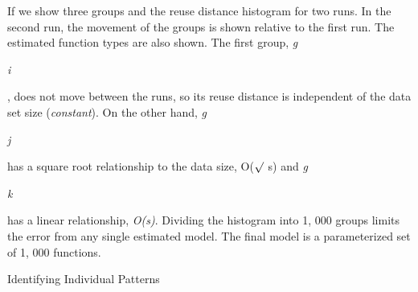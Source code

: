 \documentclass[12pt]{article}
\begin{document}
\vspace{\baselineskip}
\begin{adjustwidth}{0.0in}{0.01in}
{\fontsize{10pt}{12.0pt}\selectfont \textcolor[HTML]{333333}{If we show three groups and the reuse distance histogram for two runs. In the second run, the movement of the groups is shown relative to the first run. The estimated function types are also shown. The first group, \textit{g}}{\fontsize{7pt}{8.4pt}\selectfont \textit{\textcolor[HTML]{333333}{i}}{\fontsize{10pt}{12.0pt}\selectfont \textcolor[HTML]{333333}{, does not move between the runs, so its reuse distance is independent of the data set size (\textit{constant}). On the other hand, \textit{g}}{\fontsize{7pt}{8.4pt}\selectfont \textit{\textcolor[HTML]{333333}{j}}{\fontsize{10pt}{12.0pt}\selectfont \textcolor[HTML]{333333}{ has a square root relationship to the data size, O($ \surd$ s) and \textit{g}}{\fontsize{7pt}{8.4pt}\selectfont \textit{\textcolor[HTML]{333333}{k}}{\fontsize{10pt}{12.0pt}\selectfont \textcolor[HTML]{333333}{ has a linear relationship, \textit{O(s)}. Dividing the histogram into 1, 000 groups limits the error from any single estimated model. The final model is a parameterized set of 1, 000 functions.}\par}\par}\par}\par}\par}\par}\par}\par

\end{adjustwidth}


\vspace{\baselineskip}
\begin{adjustwidth}{0.07in}{0.0in}
{\fontsize{18pt}{21.6pt}\selectfont Identifying Individual Patterns\par}\par

\end{adjustwidth}
\end{document}
